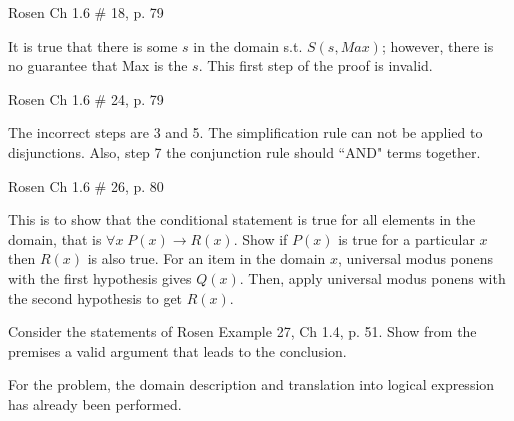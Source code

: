 \documentclass[12pt,addpoints]{exam}
\newcommand{\ra}{\rightarrow}
\begin{document}
\begin{questions}
\question Rosen Ch 1.6 \# 18, p. 79
    \ifprintanswers
        \vspace{-15pt}
    \fi
\begin{solution}
    It is true that there is some $s$ in the domain s.t. $S(s,Max)$; however, there is no guarantee that Max is the $s$.  This first step of the proof is invalid.
\end{solution}


\question Rosen Ch 1.6 \# 24, p. 79
    \ifprintanswers
        \vspace{-15pt}
    \fi
\begin{solution}
    The incorrect steps are 3 and 5.  The simplification rule can not be applied to disjunctions.  Also, step 7 the conjunction rule should ``AND" terms together.
\end{solution}


\question Rosen Ch 1.6 \# 26, p. 80
    \ifprintanswers
        \vspace{-15pt}
    \fi
\begin{solution}
    This is to show that the conditional statement is true for all elements in the domain, that is $\forall x\; P(x) \ra R(x)$.  Show if $P(x)$ is true for a particular $x$ then $R(x)$ is also true.  For an item in the domain $x$, universal modus ponens with the first hypothesis gives $Q(x)$.  Then, apply universal modus ponens with the second hypothesis to get $R(x)$.
\end{solution}


\question Consider the statements of Rosen Example 27, Ch 1.4, p. 51.  Show from the premises a valid argument that leads to the conclusion.
    \ifprintanswers
        \vspace{-10pt}
    \fi
\begin{solution}
    For the problem, the domain description and translation into logical expression has already been performed.


\end{solution}
\end{questions}
\end{document}
